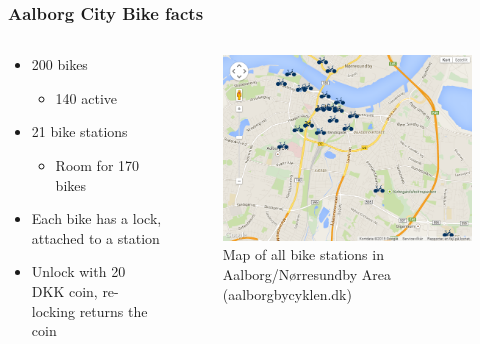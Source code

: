 \begin{frame}
\frametitle{Aalborg City Bike facts}
\begin{columns}
\begin{column}{.44\textwidth}
\begin{itemize}
\item 200 bikes
\begin{itemize}
\item 140 active
\end{itemize}
\item 21 bike stations
\begin{itemize}
\item Room for 170 bikes
\end{itemize}
\item Each bike has a lock, attached to a station
\item Unlock with 20 DKK coin, re-locking returns the coin
\end{itemize}
\end{column}
\begin{column}{.44\textwidth}
\begin{figure}
\includegraphics[width=\textwidth]{graphics/acb_gmaps}
\caption{Map of all bike stations in Aalborg/Nørresundby Area (aalborgbycyklen.dk)}
\end{figure}
\end{column}
\end{columns}
\end{frame}

